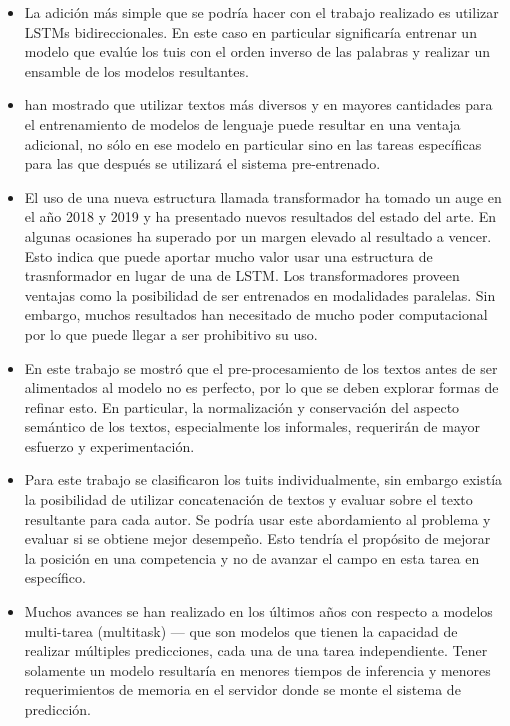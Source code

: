 \begin{itemize}

\item La adición más simple que se podría hacer con el trabajo realizado es utilizar LSTMs bidireccionales. En este caso en particular significaría entrenar un modelo que evalúe los tuis con el orden inverso de las palabras y realizar un ensamble de los modelos resultantes.

\item \textcite{radford2019language} han mostrado que utilizar textos más diversos y en mayores cantidades para el entrenamiento de modelos de lenguaje puede resultar en una ventaja adicional, no sólo en ese modelo en particular sino en las tareas específicas para las que después se utilizará el sistema pre-entrenado.

\item El uso de una nueva estructura llamada transformador ha tomado un auge en el año 2018 y 2019 y ha presentado nuevos resultados del estado del arte. En algunas ocasiones ha superado por un margen elevado al resultado a vencer. Esto indica que puede aportar mucho valor usar una estructura de trasnformador en lugar de una de LSTM. Los transformadores proveen ventajas como la posibilidad de ser entrenados en modalidades paralelas. Sin embargo, muchos resultados han necesitado de mucho poder computacional por lo que puede llegar a ser prohibitivo su uso.

\item En este trabajo se mostró que el pre-procesamiento de los textos antes de ser alimentados al modelo no es perfecto, por lo que se deben explorar formas de refinar esto. En particular, la normalización y conservación del aspecto semántico de los textos, especialmente los informales, requerirán de mayor esfuerzo y experimentación.

\item Para este trabajo se clasificaron los tuits individualmente, sin embargo existía la posibilidad de utilizar concatenación de textos y evaluar sobre el texto resultante para cada autor. Se podría usar este abordamiento al problema y evaluar si se obtiene mejor desempeño. Esto tendría el propósito de mejorar la posición en una competencia y no de avanzar el campo en esta tarea en específico.

\item Muchos avances se han realizado en los últimos años con respecto a modelos multi-tarea (multitask) --- que son modelos que tienen la capacidad de realizar múltiples predicciones, cada una de una tarea independiente. Tener solamente un modelo resultaría en menores tiempos de inferencia y menores requerimientos de memoria en el servidor donde se monte el sistema de predicción.


\end{itemize}

